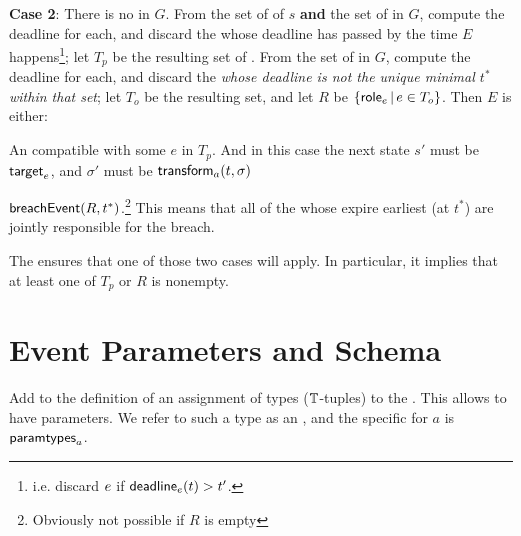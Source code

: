 \documentclass[12pt]{article}
\begin{document}
{\bf Case 2}: There is no \enabled \mustntran in $G$. From the set of \enabled \mayntrans of $s$ {\bf and} the set of \enabled \rmustntrans in $G$, compute the deadline for each, and discard the \transitions whose deadline has passed by the time $E$ happens\footnote{i.e. discard $e$ if $\textsf{deadline}_{e}(t) > t'$.};  let $T_p$ be the resulting set of \transitions. From the set of \enabled \rmustntrans in $G$, compute the deadline for each, and discard the {\transitions} {\it whose deadline is not the unique minimal \TimeStamp $t^*$ within that set}; let $T_o$ be the resulting set, and let $R$ be $\{ \textsf{role}_{e} \, \vert \, e \in T_{o} \}$. Then $E$ is either:
\begin{PPI}
	\item An \Event compatible with some \transition $e$ in $T_p$. And in this case the next state $s'$ must be $\textsf{target}_{e}$, and $\sigma'$ must be $\textsf{transform}_{a}(t,\sigma)$
	\item $\textsf{breachEvent}(R,t^*)$.\footnote{Obviously not possible if $R$ is empty} This means that all of the \Roles whose \enabled \rmustntran expire earliest (at $t^*$) are jointly responsible for the breach.
\end{PPI}
The \bostgc ensures that one of those two cases will apply. In particular, it implies that at least one of $T_p$ or $R$ is nonempty.














\section{Event Parameters and Schema} \label{eventparams}

Add to the definition of \Contract an assignment of types ($\mathbb{T}$-tuples) to the \Actions. This allows \Events to have parameters. We refer to such a type as an , and the specific \AParamsDomain for \Action $a$ is $\textsf{paramtypes}_{a}$.
\end{document}

